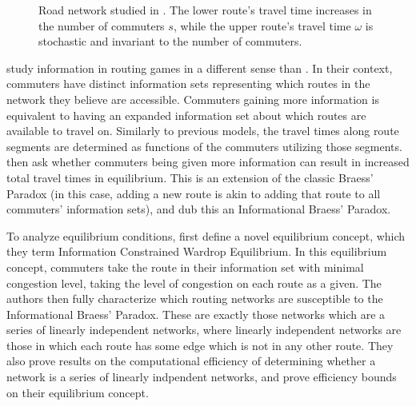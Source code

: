 \documentclass[JEL]{AEA}
\begin{document}
\begin{center}
    \begin{figure}
    \caption{Road network studied in \cite{das-2017}. The lower route's travel time increases in the number of commuters $s$, while the upper route's travel time $\omega$ is stochastic and invariant to the number of commuters. }
    \label{das-fig-1}
    \end{figure}
\end{center}    


\cite{acemoglu-2016} study information in routing games in a different sense than \cite{das-2017}. In their context, commuters have distinct information sets representing which routes in the network they believe are accessible. Commuters gaining more information is equivalent to having an expanded information set about which routes are available to travel on. Similarly to previous models, the travel times along route segments are determined as functions of the commuters utilizing those segments. \cite{acemoglu-2016} then ask whether commuters being given more information can result in increased total travel times in equilibrium. This is an extension of the classic Braess' Paradox (in this case, adding a new route is akin to adding that route to all commuters' information sets), and \cite{acemoglu-2016} dub this an Informational Braess' Paradox.

To analyze equilibrium conditions, \cite{acemoglu-2016} first define a novel equilibrium concept, which they term Information Constrained Wardrop Equilibrium. In this equilibrium concept, commuters take the route in their information set with minimal congestion level, taking the level of congestion on each route as a given. The authors then fully characterize which routing networks are susceptible to the Informational Braess' Paradox. These are exactly those networks which are a series of linearly independent networks, where linearly independent networks are those in which each route has some edge which is not in any other route. They also prove results on the computational efficiency of determining whether a network is a series of linearly indpendent networks, and prove efficiency bounds on their equilibrium concept.
\end{document}
